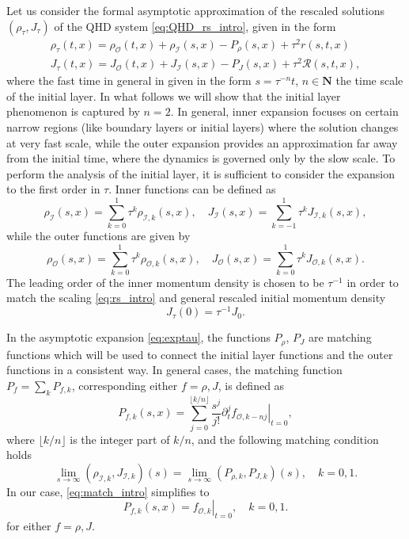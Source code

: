 \documentclass[english]{amsart}
\theoremstyle{plain}
\theoremstyle{definition}
\theoremstyle{remark}
\theoremstyle{plain}
\theoremstyle{plain}
\theoremstyle{plain}
\def\N{{\mathbf N}}%
\def\d{{\partial}}
\numberwithin{equation}{section}
\begin{document}
Let us consider the formal asymptotic approximation of the rescaled solutions $(\rho_\tau,J_\tau)$ of the QHD system \eqref{eq:QHD_rs_intro}, given in the form
\begin{equation}\label{eq:exptau}
\begin{aligned}
\rho_\tau(t,x)=\rho_\mathcal{O}(t,x)+\rho_\mathcal{I}(s,x)-P_\rho(s,x)+\tau^2 r(s,t,x)\\
J_\tau(t,x)= J_\mathcal{O}(t,x)+J_\mathcal{I}(s,x)-P_J(s,x)+\tau^2\mathcal{R}(s,t,x),
\end{aligned}
\end{equation}
where the fast time in general in given in the form $s=\tau^{-n} t$, $n\in\N$ the time scale of the initial layer. In what follows we will show that the initial layer phenomenon is captured by $n=2$. In general, inner expansion focuses on certain narrow regions (like boundary layers or initial layers) where the solution changes at very fast scale, while the outer expansion provides an approximation far away from the initial time, where the dynamics is governed only by the slow scale. To perform the analysis of the initial layer, it is sufficient to consider the expansion to the first order in $\tau$. Inner functions can be defined as
\begin{equation}\label{eq:inner}
\rho_\mathcal{I}(s,x)=\sum_{k=0}^1\tau^{k}\rho_{\mathcal{I},k}(s,x),\quad J_\mathcal{I}(s,x)=\sum_{k=-1}^1\tau^{k}J_{\mathcal{I},k}(s,x),
\end{equation}
while the outer functions are given by
\begin{equation}\label{eq:outer}
\rho_\mathcal{O}(s,x)=\sum_{k=0}^1\tau^{k}\rho_{\mathcal{O},k}(s,x),\quad J_\mathcal{O}(s,x)=\sum_{k=0}^1\tau^{k}J_{\mathcal{O},k}(s,x).
\end{equation}
The leading order of the inner momentum density is chosen to be $\tau^{-1}$ in order to match the scaling \eqref{eq:rs_intro} and general rescaled initial momentum density
\[
J_\tau(0)=\tau^{-1}J_0.
\]


In the asymptotic expansion \eqref{eq:exptau}, the functions $P_\rho$, $P_J$ are matching functions which will be used to connect the initial layer functions and the outer functions in a consistent way. In general cases, the matching function $P_f=\sum_k P_{f,k}$, corresponding either $f=\rho,J$, is defined as
\begin{equation}\label{eq:match_intro}
P_{f,k}(s,x)=\sum_{j=0}^{\lfloor k/n\rfloor}\frac{s^j}{j!}\left.\d_t^j f_{\mathcal{O},k-nj}\right|_{t=0},
\end{equation}
where $\lfloor k/n\rfloor$ is the integer part of $k/n$, and the following matching condition holds
\begin{equation}\label{eq:cond_match_intro}
\lim_{s\to\infty}(\rho_{\mathcal{I},k},J_{\mathcal{I},k})(s)=\lim_{s\to\infty}(P_{\rho,k},P_{J,k})(s),\quad k=0,1.
\end{equation}
In our case, \eqref{eq:match_intro} simplifies to
\begin{equation}
P_{f,k}(s,x)=\left. f_{\mathcal{O},k}\right|_{t=0},\quad k=0,1.
\end{equation}
for either $f=\rho,J$.
\end{document}
